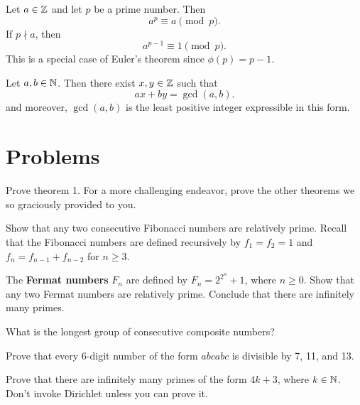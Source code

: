 \documentclass{article}
\begin{document}
\begin{corollary}
    Let \(a\in\mathbb{Z}\) and let \(p\) be a prime number. 
    Then
    \[a^p\equiv a\pmod{p}.\]
    If \(p\nmid a\), then 
    \[a^{p-1}\equiv 1\pmod{p}.\]
    This is a special case of Euler's theorem since \(\phi(p)=p-1\).
\end{corollary}

\begin{theorem}
    Let \(a,b\in\mathbb{N}\). 
    Then there exist \(x,y\in\mathbb{Z}\) such that
    \[ax+by=\gcd(a,b).\]
    and moreover, $\gcd(a,b)$ is the least positive integer expressible in this form.
\end{theorem}

\section{Problems}

\begin{exercise}
    Prove theorem 1.
    For a more challenging endeavor, prove the other theorems we so graciously provided to you.
\end{exercise}

\begin{exercise}
    Show that any two consecutive Fibonacci numbers are relatively prime.
    Recall that the Fibonacci numbers are defined recursively by \(f_1=f_2=1\) and \(f_n=f_{n-1}+f_{n-2}\) for \(n\geq 3\).
\end{exercise}

\begin{exercise}
    The \textbf{Fermat numbers} \(F_n\) are defined by \(F_n = 2^{2^n}+1\), where \(n\geq 0\).
    Show that any two Fermat numbers are relatively prime.
    Conclude that there are infinitely many primes.
\end{exercise}

\begin{exercise}
    What is the longest group of consecutive composite numbers?
\end{exercise}

\begin{exercise}
    Prove that every 6-digit number of the form \(abcabc\) is divisible by 7, 11, and 13.
\end{exercise}

\begin{exercise}
    Prove that there are infinitely many primes of the form \(4k+3\), where \(k\in\mathbb{N}\).
    Don't invoke Dirichlet unless you can prove it.
\end{exercise}
\end{document}
